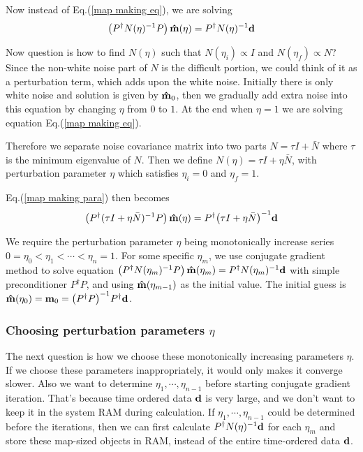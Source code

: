 \documentclass[11pt, letterpaper]{article}
\newcommand{\vbd}{\vb{d}}
\newcommand{\vbm}{\vb{m}}
\newcommand{\inv}[1]{#1^{-1}}
\newcommand{\hatm}{\vb{\hat{m}}}
\newcommand{\Pdagger}{P^{\dagger}}
\newcommand{\Nbar}{\bar{N}}
\newcommand{\PPinv}[1]{\inv{\qty(\Pdagger #1 P)}}
\begin{document}
Now instead of Eq.(\ref{map making eq}), we are solving
\begin{align}
\qty(\Pdagger \inv{N(\eta)} P)\, \hatm(\eta) 
= \Pdagger \inv{N(\eta)} \vbd \label{map making para}
\end{align}

Now question is how to find $N(\eta)$ such that $N(\eta_i) \propto I$
and $N (\eta_f) \propto N$?
Since the non-white noise part of $N$ is the difficult portion,
we could think of it as a perturbation term, which adds upon the white noise.
Initially there is only white noise and solution is given by $\hatm_0$,
then we gradually add extra noise into this equation by changing $\eta$ from 
$0$ to $1$.
At the end when $\eta=1$ we are solving equation Eq.(\ref{map making eq}).

Therefore we separate noise covariance matrix into two parts
$N = \tau I + \Nbar$ where $\tau$ is the minimum eigenvalue of $N$. 
Then we define $N(\eta) = \tau I + \eta \Nbar$, 
with perturbation parameter $\eta$ which satisfies $\eta_i = 0$ and $\eta_f=1$.

Eq.(\ref{map making para}) then becomes
\begin{align}
\qty(\Pdagger \inv{(\tau I + \eta \Nbar)}P) \, \hatm(\eta) 
= \Pdagger \inv{\qty(\tau I + \eta \Nbar)} \vbd \label{map making perturb} 
\end{align}

We require the perturbation parameter $\eta$ being monotonically increase
series $0 = \eta_0 < \eta_1 < \cdots < \eta_n = 1$.
For some specific $\eta_m$, we use conjugate gradient method to solve equation 
$\qty(\Pdagger \inv{N(\eta_m)} P)\, 
\hatm(\eta_m) = \Pdagger \inv{N(\eta_m)} \vbd$
with simple preconditioner $\Pdagger P$,
and using $\hatm(\eta_{m-1})$ as the initial value.
The initial guess is $\hatm(\eta_0) = \vbm_0 = \PPinv{} \Pdagger \vbd$.


\subsubsection{Choosing perturbation parameters $\eta$}
The next question is how we choose these monotonically increasing parameters
$\eta$. 
If we choose these parameters inappropriately, it would only makes it converge
slower.
Also we want to determine $\eta_1, \cdots, \eta_{n-1}$ before starting conjugate
gradient iteration.
That's because time ordered data $\vbd$ is very large,
and we don't want to keep it in the system RAM during calculation.
If $\eta_1, \cdots, \eta_{n-1}$ could be determined before the iterations, 
then we can first calculate $\Pdagger \inv{N(\eta)} \vbd$ for each $\eta_m$
and store these map-sized objects in RAM,
instead of the entire time-ordered data $\vbd$.
\end{document}
